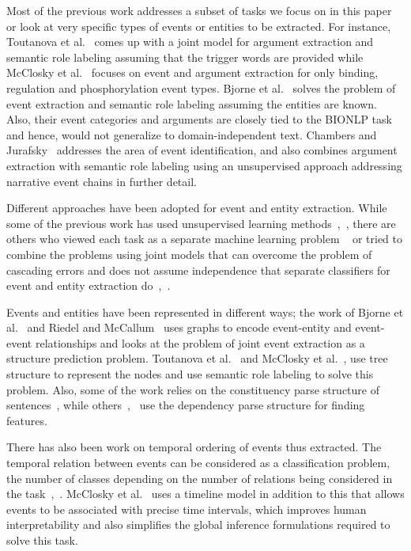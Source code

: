 Most of the previous work addresses a subset of tasks we focus on in this paper or look at very specific types of events or entities to be extracted.  For instance, Toutanova et al.~ comes up with a joint model for argument extraction and semantic role labeling assuming that the trigger words are provided while McClosky et al.~ focuses on event and argument extraction for only binding, regulation and phosphorylation event types. Bjorne et al.~ solves the problem of event extraction and semantic role labeling assuming the entities are known. Also, their event categories and arguments are closely tied to the BIONLP task and hence, would not generalize to domain-independent text. Chambers and Jurafsky~ addresses the area of event identification, and also combines argument extraction with semantic role labeling using an unsupervised approach addressing narrative event chains in further detail. 

Different approaches have been adopted for event and entity extraction. While some of the previous work has used unsupervised learning methods~\cite{chju2008},~\cite{chju2009}, there are others who viewed each task as a separate machine learning problem ~\cite{bjorne} or tried to combine the problems using joint models that can overcome the problem of cascading errors and does not assume independence that separate classifiers for event and entity extraction do~\cite{toutanova},~\cite{riedelmc}.

Events and entities have been represented in different ways; the work of Bjorne et al.~ and Riedel and McCallum~ uses graphs to encode event-entity and event-event relationships and looks at the problem of joint event extraction as a structure prediction problem. Toutanova et al.~ and McClosky et al.~, use tree structure to represent the nodes and use semantic role labeling to solve this problem. Also, some of the work relies on the constituency parse structure of sentences~\cite{toutanova}, while others~\cite{bjorne},~\cite{mcclosky} use the dependency parse structure for finding features. 

There has also been work on temporal ordering of events thus extracted. The temporal relation between events can be considered as a classification problem, the number of classes depending on the number of relations being considered in the task~,~. McClosky et al.~ uses a timeline model in addition to this that allows events to be associated with precise time intervals, which improves human interpretability and also simplifies the global inference formulations required to solve this task.	